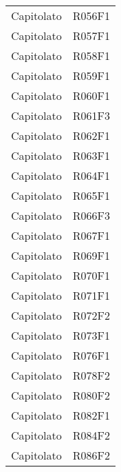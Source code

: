 \documentclass[../analisi-dei-requisiti.tex]{subfiles}
\begin{document}
\begin{longtable}[H]{ p{3cm} | p{4cm} }
  Capitolato                    & R056F1                               \\
  Capitolato                    & R057F1                               \\
  Capitolato                    & R058F1                               \\
  Capitolato                    & R059F1                               \\
  Capitolato                    & R060F1                               \\
  Capitolato                    & R061F3                               \\
  Capitolato                    & R062F1                               \\
  Capitolato                    & R063F1                               \\
  Capitolato                    & R064F1                               \\
  Capitolato                    & R065F1                               \\
  Capitolato                    & R066F3                               \\
  Capitolato                    & R067F1                               \\
  Capitolato                    & R069F1                               \\
  Capitolato                    & R070F1                               \\
  Capitolato                    & R071F1                               \\
  Capitolato                    & R072F2                               \\
  Capitolato                    & R073F1                               \\
  Capitolato                    & R076F1                               \\
  Capitolato                    & R078F2                               \\
  Capitolato                    & R080F2                               \\
  Capitolato                    & R082F1                               \\
  Capitolato                    & R084F2                               \\
  Capitolato                    & R086F2                               \\

\end{longtable}
\end{document}

